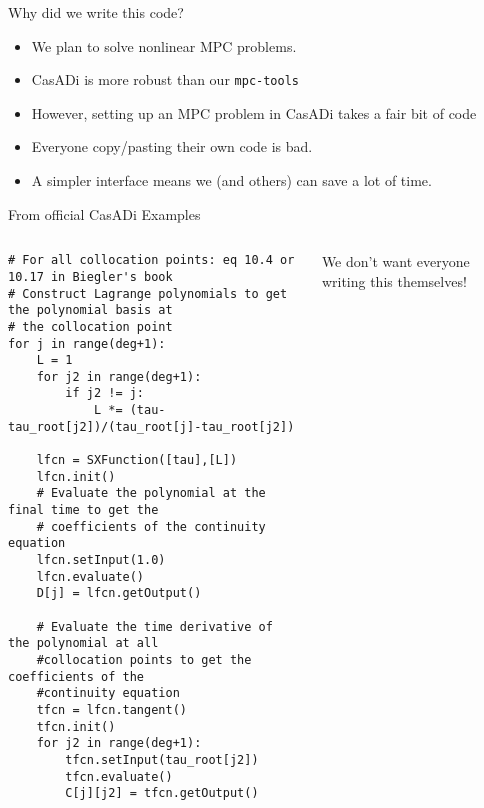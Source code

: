 \documentclass[xcolor=dvipsnames]{beamer}
\begin{document}
\begin{frame}{Why did we write this code?}

\begin{itemize}
    \item We plan to solve nonlinear MPC problems.
    \item CasADi is more robust than our \texttt{mpc-tools}
    \item However, setting up an MPC problem in CasADi takes a fair bit of code
    \item Everyone copy/pasting their own code is bad.
    \item A simpler interface means we (and others) can save a lot of time.
\end{itemize}

\end{frame}

\begin{frame}[fragile]{From official CasADi Examples}

\begin{columns}
    \begin{column}{.75\textwidth}
        
\begin{lstlisting}[style=python,basicstyle=\ttfamily\fontsize{6}{8}\selectfont]
# For all collocation points: eq 10.4 or 10.17 in Biegler's book
# Construct Lagrange polynomials to get the polynomial basis at
# the collocation point
for j in range(deg+1):
    L = 1
    for j2 in range(deg+1):
        if j2 != j:
            L *= (tau-tau_root[j2])/(tau_root[j]-tau_root[j2])
    
    lfcn = SXFunction([tau],[L])
    lfcn.init()
    # Evaluate the polynomial at the final time to get the
    # coefficients of the continuity equation
    lfcn.setInput(1.0)
    lfcn.evaluate()
    D[j] = lfcn.getOutput()
    
    # Evaluate the time derivative of the polynomial at all
    #collocation points to get the coefficients of the
    #continuity equation
    tfcn = lfcn.tangent()
    tfcn.init()
    for j2 in range(deg+1):
        tfcn.setInput(tau_root[j2])
        tfcn.evaluate()
        C[j][j2] = tfcn.getOutput()
\end{lstlisting}
    \end{column}
    \begin{column}{.25\textwidth}
        We don't want everyone writing this themselves!
    \end{column}
\end{columns}

\end{frame}
\end{document}
